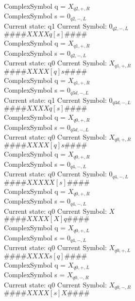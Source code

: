 \documentclass[10pt, a4paper]{article}
\begin{document}
ComplexSymbol q = $X_{q2,+,R}$ \\
ComplexSymbol s = $0_{q2,-,L}$ \\ 
 \medskip
Current state: q1	 Current Symbol: 	 $0_{q2,-,L}$\\
$\# \#\# \# X X X X q [ s ] \# \# \# \# $ \\
ComplexSymbol q = $X_{q1,+,R}$ \\
ComplexSymbol s = $0_{q2,-,L}$ \\ 
 \medskip
Current state: q0	 Current Symbol: 	 $X_{q1,+,R}$\\
$\# \#\# \# X X X X [ q ] s \# \# \# \# $ \\
ComplexSymbol q = $X_{q1,+,R}$ \\
ComplexSymbol s = $0_{q3d,-,L}$ \\ 
 \medskip
Current state: q1	 Current Symbol: 	 $0_{q3d,-,L}$\\
$\# \#\# \# X X X X q [ s ] \# \# \# \# $ \\
ComplexSymbol q = $X_{q0,+,R}$ \\
ComplexSymbol s = $0_{q3d,-,L}$ \\ 
 \medskip
Current state: q0	 Current Symbol: 	 $X_{q0,+,R}$\\
$\# \#\# \# X X X X [ q ] s \# \# \# \# $ \\
ComplexSymbol q = $X_{q0,+,R}$ \\
ComplexSymbol s = $0_{q4,-,L}$ \\ 
 \medskip
Current state: q0	 Current Symbol: 	 $0_{q4,-,L}$\\
$\# \#\# \# X X X X X [ s ] \# \# \# \# $ \\
ComplexSymbol q = $X_{q0,+,R}$ \\
ComplexSymbol s = $0_{q4,-,L}$ \\ 
 \medskip
Current state: q0	 Current Symbol: 	 $X$\\
$\# \#\# \# X X X X [ X ] q \# \# \# \# $ \\
ComplexSymbol q = $X_{q0,+,L}$ \\
ComplexSymbol s = $0_{q4,-,L}$ \\ 
 \medskip
Current state: q0	 Current Symbol: 	 $X_{q0,+,L}$\\
$\# \#\# \# X X X X s [ q ] \# \# \# \# $ \\
ComplexSymbol q = $X_{q0,+,L}$ \\
ComplexSymbol s = $X_{q0,-,R}$ \\ 
 \medskip
Current state: q0	 Current Symbol: 	 $X_{q0,-,R}$\\
$\# \#\# \# X X X X [ s ] X \# \# \# \# $ \\
\end{document}
